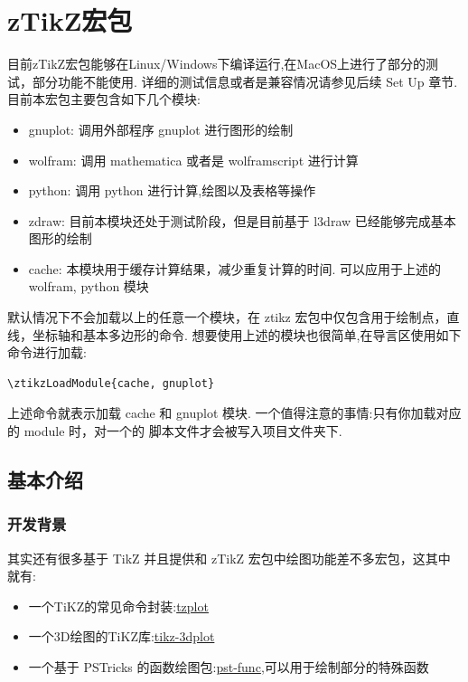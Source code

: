 \chapter{zTikZ{}宏包}\label{start-use-package}
目前zTikZ宏包能够在Linux/Windows下编译运行,在MacOS上进行了部分的测试，部分功能不能使用.
详细的测试信息或者是兼容情况请参见后续 Set Up 章节. 目前本宏包主要包含如下几个模块:

\begin{itemize}
  \item gnuplot: 调用外部程序 gnuplot 进行图形的绘制
  \item wolfram: 调用 mathematica 或者是 wolframscript 进行计算
  \item python: 调用 python 进行计算,绘图以及表格等操作
  \item zdraw: 目前本模块还处于测试阶段，但是目前基于 l3draw 已经能够完成基本图形的绘制
  \item cache: 本模块用于缓存计算结果，减少重复计算的时间. 可以应用于上述的 wolfram, python 模块
\end{itemize}

默认情况下不会加载以上的任意一个模块，在 ztikz 宏包中仅包含用于绘制点，直线，坐标轴和基本多边形的命令.
想要使用上述的模块也很简单,在导言区使用如下命令进行加载:
\begin{verbatim}
\ztikzLoadModule{cache, gnuplot}
\end{verbatim}

上述命令就表示加载 cache 和 gnuplot 模块. 一个值得注意的事情:只有你加载对应的 module 时，对一个的
脚本文件才会被写入项目文件夹下.

\section{基本介绍}
\subsection{开发背景}
其实还有很多基于 TikZ 并且提供和 zTikZ 宏包中绘图功能差不多宏包，这其中就有:
\begin{itemize}
    \item 一个TiKZ的常见命令封装:\href{https://ctan.org/tex-archive/graphics/pgf/contrib/tzplot}{tzplot}
    \item 一个3D绘图的TiKZ库:\href{https://ctan.org/pkg/tikz-3dplot}{tikz-3dplot}
    \item 一个基于 PSTricks 的函数绘图包:\href{https://ctan.org/pkg/pst-func}{pst-func},可以用于绘制部分的特殊函数
\end{itemize}

